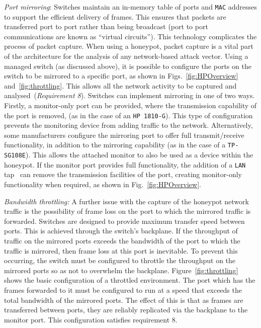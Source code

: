 \documentclass{ieeeaccess}
\begin{document}
\noindent\textit{Port mirroring}: Switches maintain an in-memory table of ports
and \texttt{MAC} addresses to support the efficient delivery of frames. This
ensures that packets are transferred port to port rather than being broadcast
(port to port communications are known as ``virtual circuits''). This technology
complicates the process of packet capture. When using a honeypot, packet
capture is a vital part of the architecture for the analysis of any
network-based attack vector. Using a managed switch (as discussed above), it is
possible to configure the ports on the switch to be mirrored to a specific
port, as shown in Figs.~\ref{fig:HPOverview} and~\ref{fig:throttling}. This
allows all the network activity to be captured and analysed~(\textit{Requirement
8}). Switches can implement mirroring in one of two ways. Firstly, a
monitor-only port can be provided, where the transmission capability of the
port is removed, (as in the case of an \texttt{HP 1810-G}). This type of
configuration prevents the monitoring device from adding traffic to the
network. Alternatively, some manufacturers configure the mirroring port to
offer full transmit/receive functionality, in addition to the mirroring
capability (as in the case of a \texttt{TP-SG108E}). This allows the attached
monitor to also be used as a device within the honeypot. If the monitor port
provides full functionality, the addition of a \texttt{LAN} tap~\cite{RB:13}
can remove the transmission facilities of the port, creating monitor-only
functionality when required, as shown in Fig.~\ref{fig:HPOverview}.
\newline

\noindent\textit{Bandwidth throttling:} A further issue with the capture of the
honeypot network traffic is the possibility of frame loss on the port to which
the mirrored traffic is forwarded.  Switches are designed to provide maximum
transfer speed between ports. This is achieved through the switch's backplane.
If the throughput of traffic on the mirrored ports exceeds the bandwidth of the
port to which the traffic is mirrored, then frame loss at this port is
inevitable. To prevent this occurring, the switch must be configured to throttle
the throughput on the mirrored ports so as not to overwhelm the backplane.
Figure~\ref{fig:throttling} shows the basic configuration of a throttled
environment. The port which has the frames forwarded to it must be configured
to run at a speed that exceeds the total bandwidth of the mirrored ports. The
effect of this is that as frames are transferred between ports, they are
reliably replicated via the backplane to the monitor port. This configuration
satisfies requirement 8. 
\newline
\end{document}
